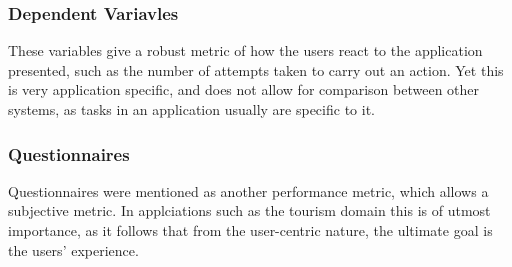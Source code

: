 \subsubsection{Dependent Variavles}
These variables give a robust metric of how the users react to the 
application presented, such as the number of attempts taken to carry out an action.
Yet this is very application specific, and does not allow for comparison between other systems, as 
tasks in an application usually are specific to it.
\\

\subsubsection{Questionnaires}
Questionnaires were mentioned as another performance metric, which allows a subjective metric. 
In applciations such as the tourism domain this is of utmost importance, as it follows that 
from the user-centric nature, the ultimate goal is the users' experience.  
